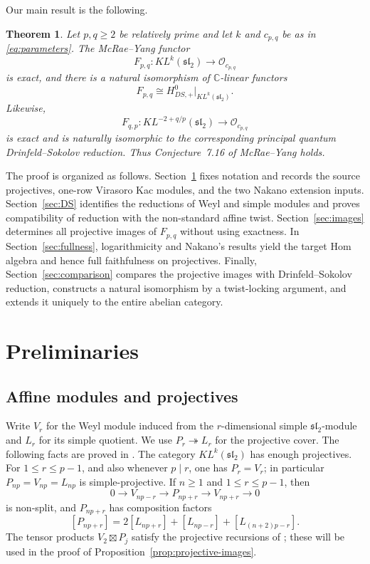 \documentclass[12pt,leqno]{amsart}
\numberwithin{equation}{section}
\newtheorem{thm}{Theorem}[section]
\newcommand{\boxt}{\boxtimes}
\newcommand{\KL}{KL}
\newcommand{\Oc}{\mathcal O}
\def\C{\mathbb{C}}
\begin{document}
Our main result is the following.

\begin{thm}\label{thm:main}
Let $p,q\geq2$ be relatively prime and let $k$ and $c_{p,q}$ be as in
\eqref{eq:parameters}.  The McRae--Yang functor
\[
 F_{p,q}:\KL^k(\mathfrak{sl}_2)\longrightarrow\Oc_{c_{p,q}}
\]
is exact, and there is a natural isomorphism of $\C$-linear functors
\[
 F_{p,q}\cong H^0_{DS,+}\big|_{\KL^k(\mathfrak{sl}_2)}.
\]
Likewise,
\[
 F_{q,p}:\KL^{-2+q/p}(\mathfrak{sl}_2)\longrightarrow\Oc_{c_{p,q}}
\]
is exact and is naturally isomorphic to the corresponding principal quantum
Drinfeld--Sokolov reduction.  Thus Conjecture~7.16 of McRae--Yang holds.
\end{thm}

The proof is organized as follows.  Section~\ref{sec:prelim} fixes notation
and records the source projectives, one-row Virasoro Kac modules, and the two
Nakano extension inputs.  Section~\ref{sec:DS} identifies the reductions of
Weyl and simple modules and proves compatibility of reduction with the
non-standard affine twist.  Section~\ref{sec:images} determines all
projective images of $F_{p,q}$ without using exactness.  In
Section~\ref{sec:fullness}, logarithmicity and Nakano's results yield the
target Hom algebra and hence full faithfulness on projectives.  Finally,
Section~\ref{sec:comparison} compares the projective images with
Drinfeld--Sokolov reduction, constructs a natural isomorphism by a
twist-locking argument, and extends it uniquely to the entire abelian
category.

\section{Preliminaries}\label{sec:prelim}

\subsection{Affine modules and projectives}

Write $V_r$ for the Weyl module induced from the $r$-dimensional simple
$\mathfrak{sl}_2$-module and $L_r$ for its simple quotient.  We use
$P_r\twoheadrightarrow L_r$ for the projective cover.  The following facts
are proved in \cite[Sections~2--4]{McRaeYang}.  The category
$\KL^k(\mathfrak{sl}_2)$ has enough projectives.  For $1\leq r\leq p-1$,
and also whenever $p\mid r$, one has $P_r=V_r$; in particular
$P_{np}=V_{np}=L_{np}$ is simple-projective.  If $n\geq1$ and
$1\leq r\leq p-1$, then
\begin{equation}\label{eq:source-projective-filtration}
 0\longrightarrow V_{np-r}\longrightarrow P_{np+r}
 \longrightarrow V_{np+r}\longrightarrow0
\end{equation}
is non-split, and $P_{np+r}$ has composition factors
\begin{equation}\label{eq:source-composition-factors}
 [P_{np+r}]=2[L_{np+r}]+[L_{np-r}]+[L_{(n+2)p-r}].
\end{equation}
The tensor products $V_2\boxt P_j$ satisfy the projective recursions of
\cite[Theorem~4.8]{McRaeYang}; these will be used in the proof of
Proposition~\ref{prop:projective-images}.
\end{document}
